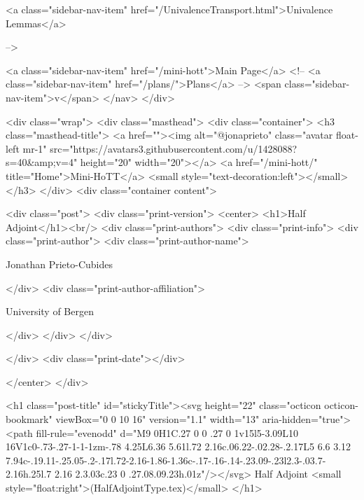       
    
      
        
          <a class="sidebar-nav-item" href="/UnivalenceTransport.html">Univalence Lemmas</a>
        
      
     -->

    <a class="sidebar-nav-item" href="/mini-hott">Main Page</a>
    <!-- <a class="sidebar-nav-item" href="/plans/">Plans</a> -->
    <span class="sidebar-nav-item">v</span>
  </nav>
</div>

    <div class="wrap">
      <div class="masthead">
        <div class="container">
          <h3 class="masthead-title">
            <a href=""><img alt="@jonaprieto" class="avatar float-left mr-1" src="https://avatars3.githubusercontent.com/u/1428088?s=40&amp;v=4" height="20" width="20"></a>
            <a href="/mini-hott/" title="Home">Mini-HoTT</a>
            <small style="text-decoration:left"></small>
          </h3>
        </div>
      <div class="container content">
        







<div class="post">
  <div class="print-version">
    <center>
      <h1>Half Adjoint</h1><br/>
        <div class="print-authors">
          <div class="print-info">
            <div class="print-author">
              <div class="print-author-name">
                
                  Jonathan Prieto-Cubides
                
              </div>
              <div class="print-author-affiliation">
                
                  University of Bergen
                
                </div>
            </div>
          </div>
          
          
        </div>
        <div class="print-date"></div>
        
        
    </center>
  </div>

  

  <h1 class="post-title" id="stickyTitle"><svg height="22" class="octicon octicon-bookmark" viewBox="0 0 10 16" version="1.1" width="13" aria-hidden="true"><path fill-rule="evenodd" d="M9 0H1C.27 0 0 .27 0 1v15l5-3.09L10 16V1c0-.73-.27-1-1-1zm-.78 4.25L6.36 5.61l.72 2.16c.06.22-.02.28-.2.17L5 6.6 3.12 7.94c-.19.11-.25.05-.2-.17l.72-2.16-1.86-1.36c-.17-.16-.14-.23.09-.23l2.3-.03.7-2.16h.25l.7 2.16 2.3.03c.23 0 .27.08.09.23h.01z"/></svg> Half Adjoint <small style="float:right">(HalfAdjointType.tex)</small>
  </h1>

